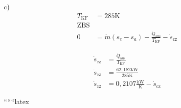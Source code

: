 c) 
\begin{align*}
T_{\text{KF}} &= 285 \text{K} \\
\text{ZBS} \\
0 &= \dot{m} (s_e - s_a) + \frac{\dot{Q}_{\text{aus}}}{T_{\text{KF}}} - \dot{s}_{\text{cz}}
\end{align*}

\begin{align*}
\dot{s}_{\text{cz}} &= \frac{\dot{Q}_{\text{aus}}}{T_{\text{KF}}} \\
\dot{s}_{\text{cz}} &= \frac{62,182 \text{kW}}{285 \text{K}} \\
\dot{s}_{\text{cz}} &= 0,2107 \frac{\text{kW}}{\text{K}} - \dot{s}_{\text{cz}}
\end{align*}

``````latex